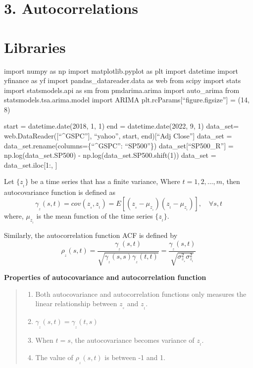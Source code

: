 \documentclass[11pt]{article}
\providecommand{\tightlist}{%
      \setlength{\itemsep}{0pt}\setlength{\parskip}{0pt}}
\begin{document}
    \hypertarget{autocorrelations}{%
\section{\texorpdfstring{\textbf{3.
Autocorrelations}}{3. Autocorrelations}}\label{autocorrelations}}

    \hypertarget{libraries}{%
\section{Libraries}\label{libraries}}

import numpy as np import matplotlib.pyplot as plt import datetime
import yfinance as yf import pandas\_datareader.data as web from scipy
import stats import statsmodels.api as sm from pmdarima.arima import
auto\_arima from statsmodels.tsa.arima.model import ARIMA
plt.rcParams{[}``figure.figsize''{]} = (14, 8)

    start = datetime.date(2018, 1, 1) end = datetime.date(2022, 9, 1)
data\_set= web.DataReader({[}``\^{}GSPC''{]}, ``yahoo'', start,
end){[}``Adj Close''{]} data\_set =
data\_set.rename(columns=\{``\^{}GSPC'': ``SP500''\})
data\_set{[}``SP500\_R''{]} = np.log(data\_set.SP500) -
np.log(data\_set.SP500.shift(1)) data\_set = data\_set.iloc{[}1:, {]}

    Let \(\{z_{_t}\}\) be a time series that has a finite variance, Where
\(t=1,2,\dots , m\), then autocovariance function is defined as
\[\gamma_{_{z}}(s,t) = cov(z_{_s} ,z_{_t})= E[(z_{_s}-\mu_{z_{_s}})(z_{_t}-\mu_{z_{_t}})], \quad \forall s,t \]
where, \(\mu_{z_{_t}}\) is the mean function of the time series
\(\{z_{_t}\}\).

    Similarly, the autocorrelation function ACF is defined by
\[ \rho_{_{z}}(s,t) = \frac{\gamma_{_{z}}(s,t)}{\sqrt{\gamma_{_{z}}(s,s)\gamma_{_{z}}(t,t)}} =\frac{\gamma_{_{z}}(s,t)}{\sqrt{\sigma_{z_{_s}}^2\sigma_{z_{_t}}^{2}}}\]

\textbf{Properties of autocovariance and autocorrelation function}

\begin{quote}
\begin{enumerate}
\def\labelenumi{\arabic{enumi}.}
\tightlist
\item
  Both autocovariance and autocorrelation functions only measures the
  linear relationship between \(z_{_s}\) and \(z_{_t}\).
\item
  \(\gamma_{_{z}}(s,t)=\gamma_{_{z}}(t,s)\)
\item
  When \(t=s\), the autocovariance becomes variance of \(z_{_t}\).
\item
  The value of \(\rho_{_{z}}(s,t)\) is between -1 and 1.
\end{enumerate}
\end{quote}
\end{document}
